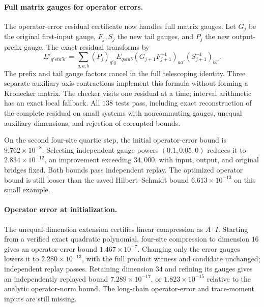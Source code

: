 \documentclass[11pt]{article}
\begin{document}
\paragraph{Full matrix gauges for operator errors.}
The operator-error residual certificate now handles full matrix gauges.
Let $G_j$ be the original first-input gauge, $F_j,S_j$ the new tail gauges,
and $P_j$ the new output-prefix gauge. The exact residual transforms by
\[
 E'_{q'sta'b'}=\sum_{q,a,b}(P_j)_{q'q}E_{qstab}
 (G_{j+1}F_{j+1}^{-1})_{aa'}(S_{j+1}^{-1})_{bb'}.
\]
The prefix and tail gauge factors cancel in the full telescoping identity.
Three separate auxiliary-axis contractions implement this formula without
forming a Kronecker matrix. The checker visits one residual at a time;
interval arithmetic has an exact local fallback. All $138$ tests pass,
including exact reconstruction of the complete residual on small systems
with noncommuting gauges, unequal auxiliary dimensions, and rejection of
corrupted bounds.

On the second four-site quartic step, the initial operator-error bound is
$9.762\times10^{-8}$. Selecting independent gauge powers $(0.1,0.05,0)$
reduces it to $2.834\times10^{-12}$, an improvement exceeding $34{,}000$,
with input, output, and original bridges fixed. Both bounds pass independent
replay. The optimized operator bound is still looser than the saved
Hilbert--Schmidt bound $6.613\times10^{-13}$ on this small example.

\paragraph{Operator error at initialization.}
The unequal-dimension extension certifies linear compression as $A\cdot I$.
Starting from a verified exact quadratic polynomial, four-site compression
to dimension $16$ gives an operator-error bound $1.467\times10^{-7}$.
Changing only the error gauges lowers it to $2.280\times10^{-13}$, with the
full product witness and candidate unchanged; independent replay passes.
Retaining dimension $34$ and refining its gauges gives an independently replayed
bound $7.289\times10^{-17}$, or $1.823\times10^{-15}$ relative to the
analytic operator-norm bound.
The long-chain operator-error and trace-moment inputs are still missing.
\end{document}
